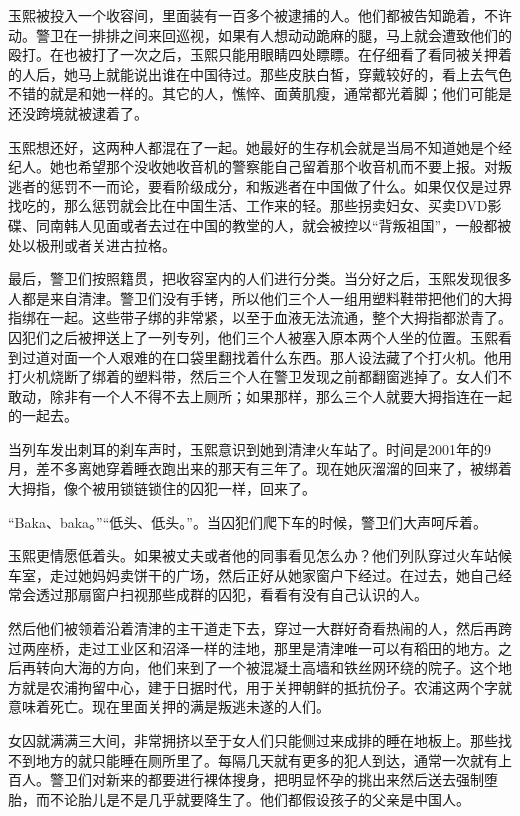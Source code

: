 玉熙被投入一个收容间，里面装有一百多个被逮捕的人。他们都被告知跪着，不许动。警卫在一排排之间来回巡视，如果有人想动动跪麻的腿，马上就会遭致他们的殴打。在也被打了一次之后，玉熙只能用眼睛四处瞟瞟。在仔细看了看同被关押着的人后，她马上就能说出谁在中国待过。那些皮肤白皙，穿戴较好的，看上去气色不错的就是和她一样的。其它的人，憔悴、面黄肌瘦，通常都光着脚；他们可能是还没跨境就被逮着了。

玉熙想还好，这两种人都混在了一起。她最好的生存机会就是当局不知道她是个经纪人。她也希望那个没收她收音机的警察能自己留着那个收音机而不要上报。对叛逃者的惩罚不一而论，要看阶级成分，和叛逃者在中国做了什么。如果仅仅是过界找吃的，那么惩罚就会比在中国生活、工作来的轻。那些拐卖妇女、买卖DVD影碟、同南韩人见面或者去过在中国的教堂的人，就会被控以“背叛祖国”，一般都被处以极刑或者关进古拉格。

最后，警卫们按照籍贯，把收容室内的人们进行分类。当分好之后，玉熙发现很多人都是来自清津。警卫们没有手铐，所以他们三个人一组用塑料鞋带把他们的大拇指绑在一起。这些带子绑的非常紧，以至于血液无法流通，整个大拇指都淤青了。囚犯们之后被押送上了一列专列，他们三个人被塞入原本两个人坐的位置。玉熙看到过道对面一个人艰难的在口袋里翻找着什么东西。那人设法藏了个打火机。他用打火机烧断了绑着的塑料带，然后三个人在警卫发现之前都翻窗逃掉了。女人们不敢动，除非有一个人不得不去上厕所；如果那样，那么三个人就要大拇指连在一起的一起去。

当列车发出刺耳的刹车声时，玉熙意识到她到清津火车站了。时间是2001年的9月，差不多离她穿着睡衣跑出来的那天有三年了。现在她灰溜溜的回来了，被绑着大拇指，像个被用锁链锁住的囚犯一样，回来了。

“Baka、baka。”“低头、低头。”。当囚犯们爬下车的时候，警卫们大声呵斥着。

玉熙更情愿低着头。如果被丈夫或者他的同事看见怎么办？他们列队穿过火车站候车室，走过她妈妈卖饼干的广场，然后正好从她家窗户下经过。在过去，她自己经常会透过那扇窗户扫视那些成群的囚犯，看看有没有自己认识的人。

然后他们被领着沿着清津的主干道走下去，穿过一大群好奇看热闹的人，然后再跨过两座桥，走过工业区和沼泽一样的洼地，那里是清津唯一可以有稻田的地方。之后再转向大海的方向，他们来到了一个被混凝土高墙和铁丝网环绕的院子。这个地方就是农浦拘留中心，建于日据时代，用于关押朝鲜的抵抗份子。农浦这两个字就意味着死亡。现在里面关押的满是叛逃未遂的人们。

女囚就满满三大间，非常拥挤以至于女人们只能侧过来成排的睡在地板上。那些找不到地方的就只能睡在厕所里了。每隔几天就有更多的犯人到达，通常一次就有上百人。警卫们对新来的都要进行裸体搜身，把明显怀孕的挑出来然后送去强制堕胎，而不论胎儿是不是几乎就要降生了。他们都假设孩子的父亲是中国人。

